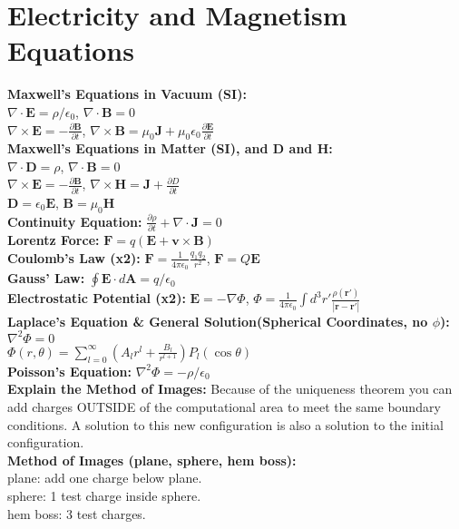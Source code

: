 \documentclass[12pt]{extarticle}
\newcommand{\E}{\mathbf{E}}
\newcommand{\B}{\mathbf{B}}
\newcommand{\D}{\mathbf{D}}
\renewcommand{\H}{\mathbf{H}}
\newcommand{\A}{\mathbf{A}}
\newcommand{\J}{\mathbf{J}}
\newcommand{\F}{\mathbf{F}}
\renewcommand{\r}{\mathbf{r}}
\newcommand{\wavr}{\left|\r-\r'\right|}
\begin{document}
\section{Electricity and Magnetism Equations}
\textbf{Maxwell's Equations in Vacuum (SI):} \\
$\nabla \cdot \E = \rho/\epsilon_0$, $\nabla \cdot \B = 0$ \\
$\nabla \times \E = -\frac{\partial \B}{\partial t}$, $\nabla \times \B = \mu_0\J + \mu_0\epsilon_0\frac{\partial \E}{\partial t}$ \\
\textbf{Maxwell's Equations in Matter (SI), and $\D$ and $\H$:} \\
$\nabla \cdot \D = \rho$, $\nabla \cdot \B = 0$ \\
$\nabla \times \E = -\frac{\partial \B}{\partial t}$, $\nabla \times \H = \J + \frac{\partial D}{\partial t}$ \\
$\D = \epsilon_0\E$, $\B = \mu_0\H$ \\
\textbf{Continuity Equation:} $\frac{\partial \rho}{\partial t}+\nabla\cdot\J = 0$ \\ 
\textbf{Lorentz Force:} $\F = q(\E+\mathbf{v}\times\B)$ \\
\textbf{Coulomb's Law (x2):} $\F = \frac{1}{4\pi\epsilon_0}\frac{q_1q_2}{r^2}$, $\F=Q\E$ \\
\textbf{Gauss' Law:} $\oint \E\cdot d\A = q/\epsilon_0$ \\
\textbf{Electrostatic Potential (x2):} $\E = -\nabla\Phi$, $\Phi = \frac{1}{4\pi\epsilon_0} \int d^3r' \frac{\rho(\r')}{\wavr}$ \\
\textbf{Laplace's Equation \& General Solution(Spherical Coordinates, no $\phi$):} $\nabla^2\Phi = 0$ \\
$\Phi(r,\theta) = \sum\limits_{l=0}^\infty \left( A_lr^l+\frac{B_l}{r^{l+1}} \right) P_l(\cos\theta)$ \\
\textbf{Poisson's Equation:} $\nabla^2\Phi = -\rho/\epsilon_0$ \\
\textbf{Explain the Method of Images:} Because of the uniqueness theorem you can add charges OUTSIDE of the computational area to meet the same boundary conditions. A solution to this new configuration is also a solution to the initial configuration. \\
\textbf{Method of Images (plane, sphere, hem boss):} \\
plane: add one charge below plane. \\
sphere: 1 test charge inside sphere. \\
hem boss: 3 test charges. \\
\end{document}
